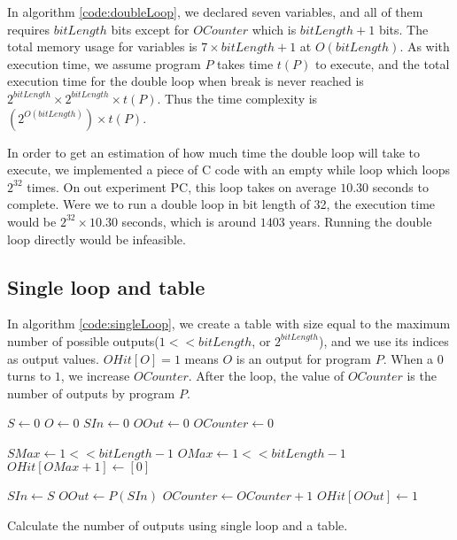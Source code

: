In algorithm \ref{code:doubleLoop}, we declared seven variables, and all of them requires $bitLength$ bits except for $OCounter$ which is $bitLength + 1$ bits. The total memory usage for variables is $7 \times bitLength + 1$ at $O(bitLength)$. As with execution time, we assume program $P$ takes time $t(P)$ to execute, and the total execution time for the double loop when break is never reached is $2^{bitLength} \times 2^{bitLength} \times t(P)$. Thus the time complexity is $(2^{O(bitLength)}) \times t(P)$.

In order to get an estimation of how much time the double loop will take to execute, we implemented a piece of C code with an empty while loop which loops $2^{32}$ times. On out experiment PC, this loop takes on average $10.30$ seconds to complete. Were we to run a double loop in bit length of 32, the execution time would be $2^{32} \times 10.30$ seconds, which is around $1403$ years. Running the double loop directly would be infeasible.

\subsection{Single loop and table}
In algorithm \ref{code:singleLoop}, we create a table with size equal to the maximum number of possible outputs($1 << bitLength$, or $2^{bitLength}$), and we use its indices as output values. $OHit[O] = 1$ means $O$ is an output for program $P$. When a $0$ turns to $1$, we increase $OCounter$. After the loop, the value of $OCounter$ is the number of outputs by program $P$. 

\renewcommand{\algorithmiccomment}[1]{// #1}
\begin{algorithm}
\begin{algorithmic}
\STATE $S \leftarrow 0$
\STATE $O \leftarrow 0$
\STATE $SIn \leftarrow 0$
\STATE $OOut \leftarrow 0$
\STATE $OCounter \leftarrow 0$

\STATE $SMax \leftarrow 1 << bitLength - 1$
\STATE $OMax \leftarrow 1 << bitLength - 1$
\STATE $OHit[OMax + 1] \leftarrow [0]$

\STATE $SIn \leftarrow S$ 
\STATE $OOut \leftarrow P(SIn)$ 
\STATE $OCounter \leftarrow OCounter + 1$
\STATE $OHit[OOut] \leftarrow 1$
\ENDIF
\ENDFOR

\end{algorithmic}

\caption[Single loop]{Calculate the number of outputs using single loop and a table.}
\label{code:singleLoop}
\end{algorithm}

